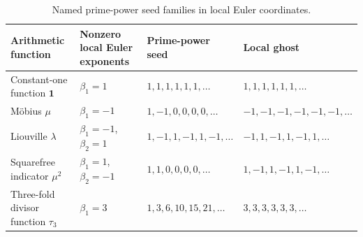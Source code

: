 \begin{table}[htbp]
\centering
\caption{Named prime-power seed families in local Euler coordinates.}
\label{tab:block07-named-local}
\scriptsize
\begin{tabularx}{\textwidth}{@{}L{0.24\textwidth}L{0.23\textwidth}L{0.25\textwidth}Y@{}}
\toprule
Arithmetic function & Nonzero local Euler exponents & Prime-power seed & Local ghost\\
\midrule
Constant-one function $\mathbf 1$ & $\beta_{1}=1$ & $1,1,1,1,1,1,\ldots$ & $1,1,1,1,1,1,\ldots$\\
M\"obius $\mu$ & $\beta_{1}=-1$ & $1,-1,0,0,0,0,\ldots$ & $-1,-1,-1,-1,-1,-1,\ldots$\\
Liouville $\lambda$ & $\beta_{1}=-1$, $\beta_{2}=1$ & $1,-1,1,-1,1,-1,\ldots$ & $-1,1,-1,1,-1,1,\ldots$\\
Squarefree indicator $\mu^2$ & $\beta_{1}=1$, $\beta_{2}=-1$ & $1,1,0,0,0,0,\ldots$ & $1,-1,1,-1,1,-1,\ldots$\\
Three-fold divisor function $\tau_3$ & $\beta_{1}=3$ & $1,3,6,10,15,21,\ldots$ & $3,3,3,3,3,3,\ldots$\\
\bottomrule
\end{tabularx}
\end{table}
